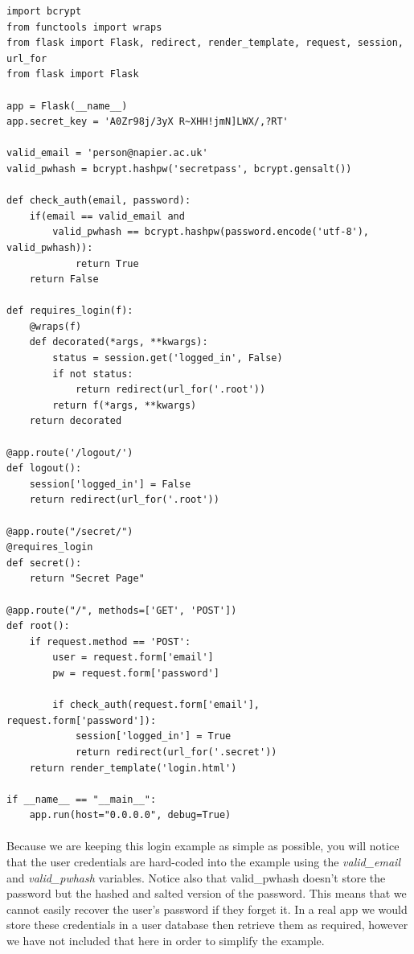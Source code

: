 \documentclass[12pt, a4paper, twoside]{book}
\begin{document}
\begin{lstlisting}
import bcrypt
from functools import wraps
from flask import Flask, redirect, render_template, request, session, url_for
from flask import Flask

app = Flask(__name__)
app.secret_key = 'A0Zr98j/3yX R~XHH!jmN]LWX/,?RT'

valid_email = 'person@napier.ac.uk'
valid_pwhash = bcrypt.hashpw('secretpass', bcrypt.gensalt())

def check_auth(email, password):
    if(email == valid_email and 
        valid_pwhash == bcrypt.hashpw(password.encode('utf-8'), valid_pwhash)):
            return True
    return False

def requires_login(f):
    @wraps(f)
    def decorated(*args, **kwargs):
        status = session.get('logged_in', False)
        if not status:
            return redirect(url_for('.root'))
        return f(*args, **kwargs)
    return decorated

@app.route('/logout/')
def logout():
    session['logged_in'] = False
    return redirect(url_for('.root'))

@app.route("/secret/")
@requires_login
def secret():
    return "Secret Page"

@app.route("/", methods=['GET', 'POST'])
def root():
    if request.method == 'POST':
        user = request.form['email']
        pw = request.form['password']
        
        if check_auth(request.form['email'], request.form['password']):
            session['logged_in'] = True
            return redirect(url_for('.secret'))
    return render_template('login.html')

if __name__ == "__main__":
    app.run(host="0.0.0.0", debug=True)
\end{lstlisting}

\paragraph{} Because we are keeping this login example as simple as possible, you will notice that the user credentials are hard-coded into the example using the \emph{valid\_email} and \emph{valid\_pwhash} variables. Notice also that valid\_pwhash doesn't store the password but the hashed and salted version of the password. This means that we cannot easily recover the user's password if they forget it. In a real app we would store these credentials in a user database then retrieve them as required, however we have not included that here in order to simplify the example.
\end{document}
